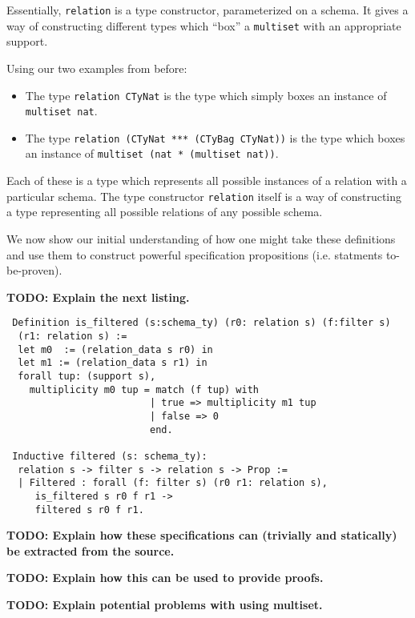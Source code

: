 Essentially, \texttt{relation} is a type constructor, parameterized on a schema. It gives a way of constructing different types which ``box'' a \texttt{multiset} with an appropriate support.

Using our two examples from before:

\begin{itemize}
  \item The type \texttt{relation CTyNat} is the type which simply boxes an
        instance of \texttt{multiset nat}.
  \item The type \texttt{relation (CTyNat *** (CTyBag CTyNat))} is the type
        which boxes an instance of \texttt{multiset (nat * (multiset nat))}.
\end{itemize}

Each of these is a type which represents all possible instances of a relation with a particular schema. The type constructor \texttt{relation} itself is a way of constructing a type representing all possible relations of any possible schema.

We now show our initial understanding of how one might take these definitions and use them to construct powerful specification propositions (i.e. statments to-be-proven).

\textbf{TODO: Explain the next listing.}

\begin{lstlisting}
 Definition is_filtered (s:schema_ty) (r0: relation s) (f:filter s)
  (r1: relation s) :=
  let m0  := (relation_data s r0) in
  let m1 := (relation_data s r1) in
  forall tup: (support s),
    multiplicity m0 tup = match (f tup) with
                         | true => multiplicity m1 tup
                         | false => 0
                         end.

 Inductive filtered (s: schema_ty):
  relation s -> filter s -> relation s -> Prop :=
  | Filtered : forall (f: filter s) (r0 r1: relation s),
     is_filtered s r0 f r1 ->
     filtered s r0 f r1.
\end{lstlisting}

\textbf{TODO: Explain how these specifications can (trivially and statically) be extracted from the source.}

\textbf{TODO: Explain how this can be used to provide proofs.}

\textbf{TODO: Explain potential problems with using multiset.}

